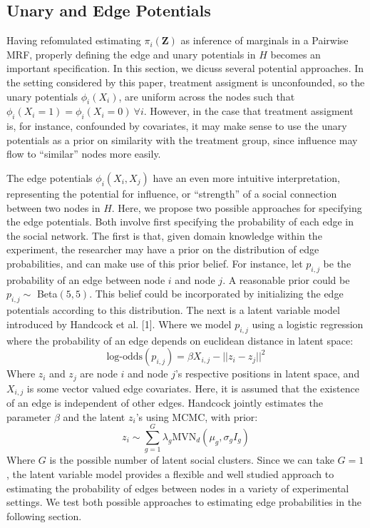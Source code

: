 \documentclass{article}
\begin{document}
\subsection{Unary and Edge Potentials}

Having refomulated estimating $\pi_i(\mathbf{Z})$ as inference of marginals in a Pairwise MRF, 
properly defining the edge and unary potentials in $H$ becomes an important specification. In this section, 
we dicuss several potential approaches. In the setting considered by this paper, treatment assigment is unconfounded, so 
the unary potentials $\phi_i(X_i)$, are uniform across the nodes such that $\phi_i(X_i = 1) = \phi_i(X_i = 0) \ \forall i$. However, 
in the case that treatment assigment is, for instance, confounded by covariates, it may make sense to use the unary potentials as a prior on similarity 
with the treatment group, since influence may flow to ``similar'' nodes more easily. 

The edge potentials $\phi_i(X_i, X_j)$ have an even more intuitive interpretation, representing the potential for influence, or ``strength'' of a social connection between two nodes in $H$. Here, 
we propose two possible approaches for specifying the edge potentials. Both involve first specifying the probability of each edge in the social network. The first is that, given domain knowledge within the experiment, the researcher may have a prior on the distribution of 
edge probabilities, and can make use of this prior belief. For instance, let $p_{i,j}$ be the probability of an edge between node 
$i$ and node $j$. A reasonable prior could be $p_{i,j} \sim $ Beta$(5, 5)$. This belief could be incorporated by initializing the 
edge potentials according to this distribution. The next is a latent variable model introduced by Handcock et al. \label{1}[1]. Where we model $p_{i,j}$ using a logistic regression where the probability of an edge depends on euclidean distance in latent space: 
\begin{displaymath}
  \mbox{log-odds}(p_{i,j}) = \beta X_{i,j} - ||z_i - z_j||^2
\end{displaymath}
Where $z_i$ and $z_j$ are node $i$ and node $j$'s respective positions in latent space, and $X_{i,j}$ is some vector valued edge covariates. Here, it is assumed that the existence of an edge is independent of other edges. 
Handcock jointly estimates the parameter $\beta$ and the latent $z_i$'s using MCMC, with prior: \begin{displaymath}
  z_i \sim \sum_{g = 1}^{G}\lambda_g \mbox{MVN}_d(\mu_g, \sigma_gI_g) 
\end{displaymath}
Where $G$ is the possible number of latent social clusters. Since we can take $G = 1$, the latent variable model provides a flexible and well 
studied approach to estimating the probability of edges between nodes in a variety of experimental settings. We test both possible approaches to estimating 
edge probabilities in the following section.
\end{document}
